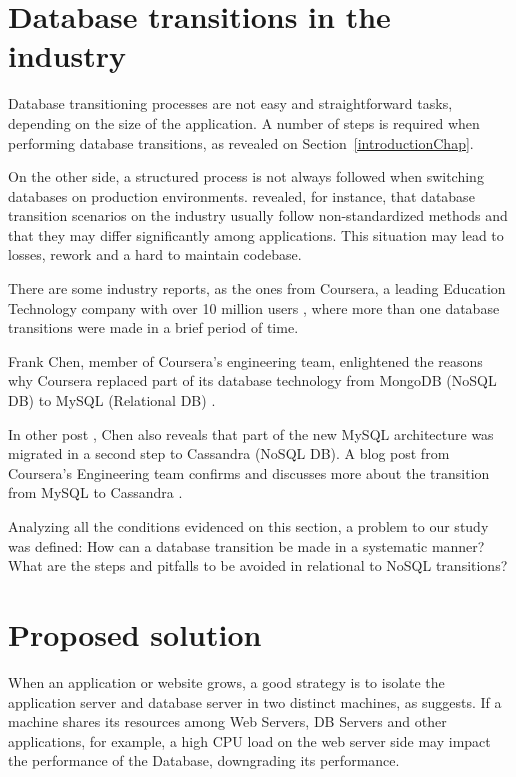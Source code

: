 \section{Database transitions in the industry}

Database transitioning processes are not easy and straightforward tasks, depending on the size of the application. A number of steps is required when performing database transitions, as revealed on Section~\ref{introductionChap}.

On the other side, a structured process is not always followed when switching databases on production environments. \cite{fabioMartinSM} revealed, for instance, that database transition scenarios on the industry usually follow non-standardized methods and that they may differ significantly among applications. This situation may lead to losses, rework and a hard to maintain codebase.

There are some industry reports, as the ones from Coursera, a leading Education Technology company with over 10 million users \cite{courserawiki}, where more than one database transitions were made in a brief period of time.  

Frank Chen, member of Coursera's engineering team, enlightened the reasons why Coursera replaced part of its database technology from MongoDB (NoSQL DB) to MySQL (Relational DB) \cite{coursera-mongodb-mysql} . 

In other post \cite{coursera-mongodb-mysql2}, Chen also reveals that part of the new MySQL architecture was migrated in a second step to Cassandra (NoSQL DB). A blog post from Coursera's Engineering team confirms and discusses more about the transition from MySQL to Cassandra \cite{coursera-mysql-cassandra}. 

Analyzing all the conditions evidenced on this section, a problem to our study was defined: How can a database transition be made in a systematic manner? What are the steps and pitfalls to be avoided in relational to NoSQL transitions? 

\section{Proposed solution}
\label{theSolution}

When an application or website grows, a good strategy is to isolate the application server and database server in two distinct machines, as \cite{dorm} suggests. If a machine shares its resources among Web Servers, DB Servers and other applications, for example, a high CPU load on the web server side may impact the performance of the Database, downgrading its performance. 

